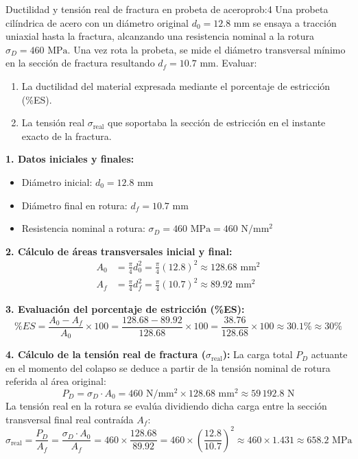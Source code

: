 \vspace{1em}

\begin{question}{Ductilidad y tensión real de fractura en probeta de acero}{prob:4}
    Una probeta cilíndrica de acero con un diámetro original $d_0 = 12.8\text{ mm}$ se ensaya a tracción uniaxial hasta la fractura, alcanzando una resistencia nominal a la rotura $\sigma_D = 460\text{ MPa}$. Una vez rota la probeta, se mide el diámetro transversal mínimo en la sección de fractura resultando $d_f = 10.7\text{ mm}$. Evaluar:
    \begin{enumerate}[label=\alph*)]
        \item La ductilidad del material expresada mediante el porcentaje de estricción (\%ES).
        \item La tensión real $\sigma_{\text{real}}$ que soportaba la sección de estricción en el instante exacto de la fractura.
    \end{enumerate}
\end{question}

\solve{}
\textbf{1. Datos iniciales y finales:}
\begin{itemize}
    \item Diámetro inicial: $d_0 = 12.8\text{ mm}$
    \item Diámetro final en rotura: $d_f = 10.7\text{ mm}$
    \item Resistencia nominal a rotura: $\sigma_D = 460\text{ MPa} = 460\text{ N}/\text{mm}^2$
\end{itemize}

\textbf{2. Cálculo de áreas transversales inicial y final:}
\begin{align*}
    A_0 & = \frac{\pi}{4} d_0^2 = \frac{\pi}{4} (12.8)^2 \approx 128.68\text{ mm}^2 \\
    A_f & = \frac{\pi}{4} d_f^2 = \frac{\pi}{4} (10.7)^2 \approx 89.92\text{ mm}^2
\end{align*}

\textbf{3. Evaluación del porcentaje de estricción (\%ES):}
\begin{equation*}
    \%ES = \frac{A_0 - A_f}{A_0} \times 100 = \frac{128.68 - 89.92}{128.68} \times 100 = \frac{38.76}{128.68} \times 100 \approx 30.1\% \approx 30\%
\end{equation*}

\textbf{4. Cálculo de la tensión real de fractura ($\sigma_{\text{real}}$):}
La carga total $P_D$ actuante en el momento del colapso se deduce a partir de la tensión nominal de rotura referida al área original:
\begin{equation*}
    P_D = \sigma_D \cdot A_0 = 460\text{ N}/\text{mm}^2 \times 128.68\text{ mm}^2 \approx 59\,192.8\text{ N}
\end{equation*}
La tensión real en la rotura se evalúa dividiendo dicha carga entre la sección transversal final real contraída $A_f$:
\begin{equation*}
    \sigma_{\text{real}} = \frac{P_D}{A_f} = \frac{\sigma_D \cdot A_0}{A_f} = 460 \times \frac{128.68}{89.92} = 460 \times \left(\frac{12.8}{10.7}\right)^2 \approx 460 \times 1.431 \approx 658.2\text{ MPa}
\end{equation*}

